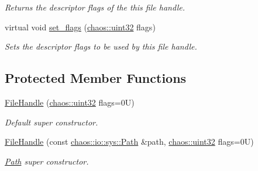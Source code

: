 \begin{DoxyCompactItemize}
\begin{DoxyCompactList}\small\item\em Returns the descriptor flags of the this file handle. \end{DoxyCompactList}\item 
virtual void \hyperlink{classchaos_1_1io_1_1sys_1_1_file_handle_a8ad8c2176597a8c56e38a3bd51b1c7dd}{set\-\_\-flags} (\hyperlink{namespacechaos_a8641b3ae4551f0b35570d4f9f4ec22d9}{chaos\-::uint32} flags)
\begin{DoxyCompactList}\small\item\em Sets the descriptor flags to be used by this file handle. \end{DoxyCompactList}\end{DoxyCompactItemize}
\subsection*{Protected Member Functions}
\begin{DoxyCompactItemize}
\item 
\hyperlink{classchaos_1_1io_1_1sys_1_1_file_handle_af5d96eae217fa6b8f770ba614b4beeaa}{File\-Handle} (\hyperlink{namespacechaos_a8641b3ae4551f0b35570d4f9f4ec22d9}{chaos\-::uint32} flags=0\-U)
\begin{DoxyCompactList}\small\item\em Default super constructor. \end{DoxyCompactList}\item 
\hyperlink{classchaos_1_1io_1_1sys_1_1_file_handle_ac27707755a7e9ab9390ee3ed50db9c3c}{File\-Handle} (const \hyperlink{classchaos_1_1io_1_1sys_1_1_path}{chaos\-::io\-::sys\-::\-Path} \&path, \hyperlink{namespacechaos_a8641b3ae4551f0b35570d4f9f4ec22d9}{chaos\-::uint32} flags=0\-U)
\begin{DoxyCompactList}\small\item\em \hyperlink{classchaos_1_1io_1_1sys_1_1_path}{Path} super constructor. \end{DoxyCompactList}\end{DoxyCompactItemize}
